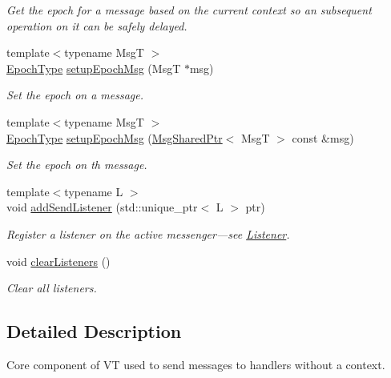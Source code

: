 \begin{DoxyCompactItemize}
\begin{DoxyCompactList}\small\item\em Get the epoch for a message based on the current context so an subsequent operation on it can be safely delayed. \end{DoxyCompactList}\item 
{\footnotesize template$<$typename MsgT $>$ }\\\hyperlink{namespacevt_a985a5adf291c34a3ca263b3378388236}{Epoch\+Type} \hyperlink{structvt_1_1messaging_1_1_active_messenger_a7b5a8fc73617491423bf68c4fbe1e2a2}{setup\+Epoch\+Msg} (MsgT $\ast$msg)
\begin{DoxyCompactList}\small\item\em Set the epoch on a message. \end{DoxyCompactList}\item 
{\footnotesize template$<$typename MsgT $>$ }\\\hyperlink{namespacevt_a985a5adf291c34a3ca263b3378388236}{Epoch\+Type} \hyperlink{structvt_1_1messaging_1_1_active_messenger_ad7402f346c73b2a50ae1feb71140d891}{setup\+Epoch\+Msg} (\hyperlink{structvt_1_1messaging_1_1_msg_shared_ptr}{Msg\+Shared\+Ptr}$<$ MsgT $>$ const \&msg)
\begin{DoxyCompactList}\small\item\em Set the epoch on th message. \end{DoxyCompactList}\item 
{\footnotesize template$<$typename L $>$ }\\void \hyperlink{structvt_1_1messaging_1_1_active_messenger_a3083324696bb4f6e55164da2cb00a1c6}{add\+Send\+Listener} (std\+::unique\+\_\+ptr$<$ L $>$ ptr)
\begin{DoxyCompactList}\small\item\em Register a listener on the active messenger---see {\ttfamily \hyperlink{structvt_1_1messaging_1_1_listener}{Listener}}. \end{DoxyCompactList}\item 
void \hyperlink{structvt_1_1messaging_1_1_active_messenger_af7bcc5ce345c1138a67b6f80abb56705}{clear\+Listeners} ()
\begin{DoxyCompactList}\small\item\em Clear all listeners. \end{DoxyCompactList}\end{DoxyCompactItemize}


\subsection{Detailed Description}
Core component of VT used to send messages to handlers without a context. 

